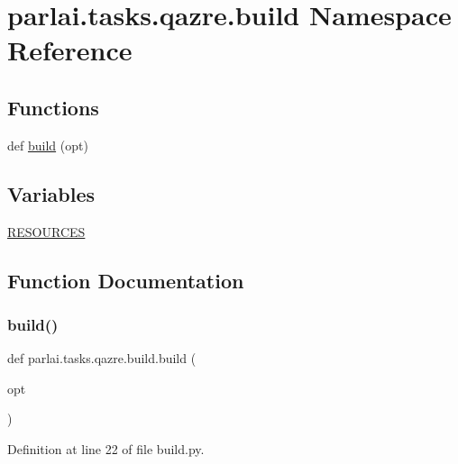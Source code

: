 \hypertarget{namespaceparlai_1_1tasks_1_1qazre_1_1build}{}\section{parlai.\+tasks.\+qazre.\+build Namespace Reference}
\label{namespaceparlai_1_1tasks_1_1qazre_1_1build}
\subsection*{Functions}
\begin{DoxyCompactItemize}
\item 
def \hyperlink{namespaceparlai_1_1tasks_1_1qazre_1_1build_a145136e1a407c8a4476fcc949082a74e}{build} (opt)
\end{DoxyCompactItemize}
\subsection*{Variables}
\begin{DoxyCompactItemize}
\item 
\hyperlink{namespaceparlai_1_1tasks_1_1qazre_1_1build_ae5e7baf49cee2df090ba6411d4fb2dc2}{R\+E\+S\+O\+U\+R\+C\+ES}
\end{DoxyCompactItemize}


\subsection{Function Documentation}
\mbox{\label{namespaceparlai_1_1tasks_1_1qazre_1_1build_a145136e1a407c8a4476fcc949082a74e}} 
\subsubsection{\texorpdfstring{build()}{build()}}
{\footnotesize\ttfamily def parlai.\+tasks.\+qazre.\+build.\+build (\begin{DoxyParamCaption}\item[{}]{opt }\end{DoxyParamCaption})}



Definition at line 22 of file build.\+py.


